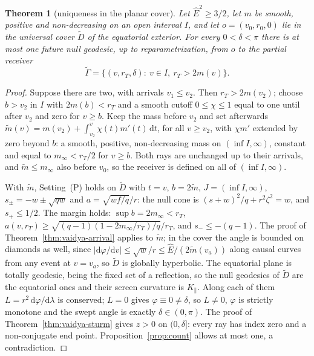 \documentclass[aip,jmp,amsmath,amssymb,reprint]{revtex4-2}
\newcommand{\Ehat}{\hat E}
\newcommand{\dd}{\mathrm{d}}
\theoremstyle{plain}
\newtheorem{theorem}{Theorem}
\theoremstyle{definition}
\begin{document}
\begin{theorem}[uniqueness in the planar cover]\label{thm:vaidya-cover-unique}
Let $\Ehat^2\ge3/2$, let $m$ be smooth, positive and non-decreasing on an open interval $I$, and
let $o=(v_0,r_0,0)$ lie in the universal cover $\widetilde D$ of the equatorial exterior. For every
$0<\delta<\pi$ there is at most one future null geodesic, up to reparametrization, from $o$ to the
partial receiver
\[
  \widetilde\Gamma=\{(v,r_T,\delta):\ v\in I,\ r_T>2m(v)\}.
\]
\end{theorem}

\begin{proof}
Suppose there are two, with arrivals $v_1\le v_2$. Then $r_T>2m(v_2)$; choose $b>v_2$ in $I$ with
$2m(b)<r_T$ and a smooth cutoff $0\le\chi\le1$ equal to one until after $v_2$ and zero for $v\ge b$.
Keep the mass before $v_2$ and set afterwards $\widetilde m(v)=m(v_2)+\int_{v_2}^v\chi(t)m'(t)\,\dd t$,
for all $v\ge v_2$, with $\chi m'$ extended by zero beyond $b$: a smooth, positive, non-decreasing mass on
$(\inf I,\infty)$, constant and equal to $m_\infty<r_T/2$ for $v\ge b$. Both rays are unchanged up to their
arrivals, and $\widetilde m\le m_\infty$ also before $v_0$, so the receiver is defined on all of $(\inf I,\infty)$.

With $\widetilde m$, Setting~(P) holds on $\widetilde D$ with $t=v$, $b=2\widetilde m$, $J=(\inf I,\infty)$,
$s_\pm=-w\pm\sqrt{qw}$ and $a=\sqrt{wf/q}/r$: the null cone is $(s+w)^2/q+r^2\zeta^2=w$, and $s_+\le1/2$. The
margin holds: $\sup b=2m_\infty<r_T$, $a(v,r_T)\ge\sqrt{(q-1)(1-2m_\infty/r_T)/q}/r_T$, and $s_-\le-(q-1)$. The
proof of Theorem~\ref{thm:vaidya-arrival} applies to $\widetilde m$; in the cover the angle is bounded on
diamonds as well, since $|\dd\varphi/\dd v|\le\sqrt w/r\le\Ehat/(2\widetilde m(v_a))$ along causal curves from any
event at $v=v_a$, so $\widetilde D$ is globally hyperbolic. The equatorial plane is totally geodesic, being the fixed set of a
reflection, so the null geodesics of $\widetilde D$ are the equatorial ones and their screen curvature
is $K_\parallel$. Along each of them $L=r^2\,\dd\varphi/\dd\lambda$ is conserved; $L=0$ gives $\varphi\equiv0\ne\delta$, so
$L\ne0$, $\varphi$ is strictly monotone and the swept angle is exactly $\delta\in(0,\pi)$. The proof of
Theorem~\ref{thm:vaidya-sturm} gives $z>0$ on $(0,\delta]$: every ray has index zero and a non-conjugate
end point. Proposition~\ref{prop:count} allows at most one, a contradiction.
\end{proof}
\end{document}
